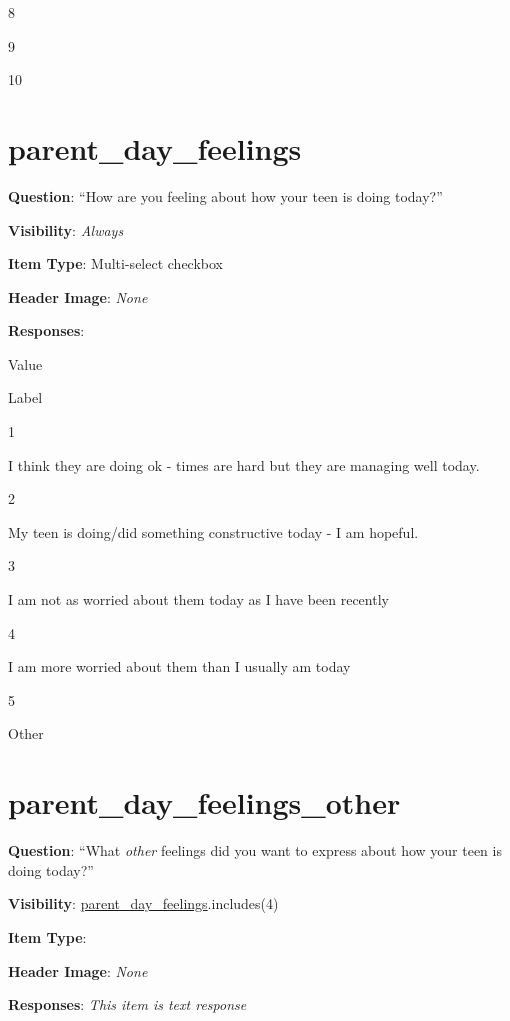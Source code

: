 \documentclass[]{book}
\begin{document}
8

9

10

\hypertarget{parent_day_feelings}{%
\section{parent\_day\_feelings}\label{parent_day_feelings}}

\textbf{Question}: ``How are you feeling about how your teen is doing today?''

\textbf{Visibility}: \emph{Always}

\textbf{Item Type}: Multi-select checkbox

\textbf{Header Image}: \emph{None}

\textbf{Responses}:

Value

Label

1

I think they are doing ok - times are hard but they are managing well today.

2

My teen is doing/did something constructive today - I am hopeful.

3

I am not as worried about them today as I have been recently

4

I am more worried about them than I usually am today

5

Other

\hypertarget{parent_day_feelings_other}{%
\section{parent\_day\_feelings\_other}\label{parent_day_feelings_other}}

\textbf{Question}: ``What \emph{other} feelings did you want to express about how your teen is doing today?''

\textbf{Visibility}: \protect\hyperlink{parent_day_feelings}{parent\_day\_feelings}.includes(4)

\textbf{Item Type}:

\textbf{Header Image}: \emph{None}

\textbf{Responses}: \emph{This item is text response}


\end{document}
